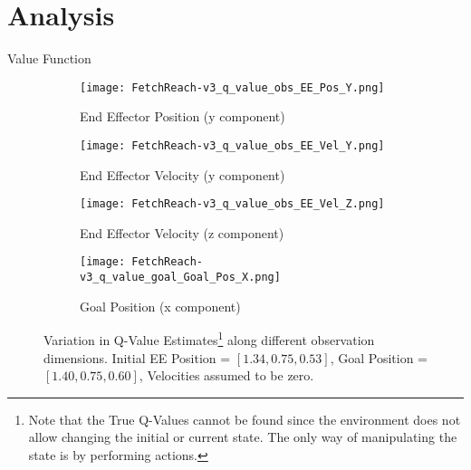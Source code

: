 \section{Analysis}

\begin{frame}{Value Function}
    \begin{figure}
        \centering
        \begin{subfigure}{0.33\textwidth}
            \centering
            \texttt{[image: FetchReach-v3\_q\_value\_obs\_EE\_Pos\_Y.png]}
            \caption{End Effector Position (y component)}
        \end{subfigure}
        \begin{subfigure}{0.33\textwidth}
            \centering
            \texttt{[image: FetchReach-v3\_q\_value\_obs\_EE\_Vel\_Y.png]}
            \caption{End Effector Velocity (y component)}
        \end{subfigure}
        \begin{subfigure}{0.33\textwidth}
            \centering
            \texttt{[image: FetchReach-v3\_q\_value\_obs\_EE\_Vel\_Z.png]}
            \caption{End Effector Velocity (z component)}
        \end{subfigure}
        \begin{subfigure}{0.33\textwidth}
            \centering
            \texttt{[image: FetchReach-v3\_q\_value\_goal\_Goal\_Pos\_X.png]}
            \caption{Goal Position (x component)}
        \end{subfigure}
        \caption{Variation in Q-Value Estimates\footnote{Note that the True Q-Values cannot be found since the environment does not allow changing the initial or current state. The only way of manipulating the state is by performing actions.} along different observation dimensions. Initial EE Position = $[1.34, 0.75, 0.53]$, Goal Position = $[1.40, 0.75, 0.60]$, Velocities assumed to be zero.}
    \end{figure}
\end{frame}


